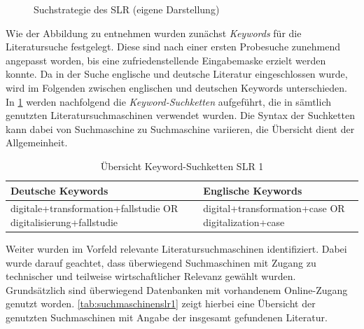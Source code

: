 \begin{figure}[H]
	\centering
	\caption[Suchstrategie des SLR]{Suchstrategie des SLR (eigene Darstellung)}
	\label{fig:suchstrategie}
\end{figure}

Wie der Abbildung zu entnehmen wurden zunächst \textit{Keywords} für die  Literatursuche festgelegt. Diese sind nach einer ersten Probesuche zunehmend angepasst worden, bis eine zufriedenstellende Eingabemaske erzielt werden konnte. Da in der Suche englische  und deutsche Literatur eingeschlossen wurde, wird im Folgenden zwischen englischen und deutschen Keywords unterschieden. In \ref{tab:keywordsslr1} werden nachfolgend die \textit{Keyword-Suchketten} aufgeführt, die in sämtlich genutzten Literatursuchmaschinen verwendet wurden. Die Syntax der Suchketten kann dabei  von Suchmaschine zu  Suchmaschine variieren, die Übersicht dient der Allgemeinheit.

\begin{table}[ht]
	\centering
	\caption{Übersicht Keyword-Suchketten SLR 1}
	\begin{tabular}{|p{7cm}|p{7cm}|}
		\hline
		\textbf{Deutsche Keywords}& \textbf{Englische Keywords} \\
		\hline
		digitale+transformation+fallstudie OR digitalisierung+fallstudie   & digital+transformation+case OR digitalization+case \\
		\hline
	\end{tabular}
	\label{tab:keywordsslr1}
\end{table}

Weiter wurden im Vorfeld relevante Literatursuchmaschinen identifiziert. Dabei wurde darauf geachtet, dass überwiegend Suchmaschinen mit Zugang zu technischer und teilweise wirtschaftlicher Relevanz gewählt wurden. Grundsätzlich sind überwiegend Datenbanken mit vorhandenem Online-Zugang genutzt worden. \ref{tab:suchmaschinenslr1} zeigt hierbei  eine Übersicht der genutzten Suchmaschinen mit Angabe der insgesamt gefundenen Literatur.

